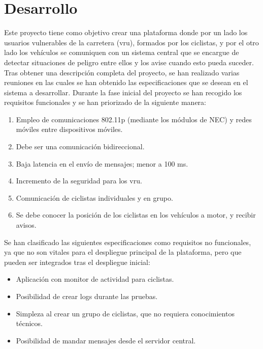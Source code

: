 \chapter{Desarrollo}\label{cha:desarrollo}
Este proyecto tiene como objetivo crear una plataforma donde por un lado los usuarios vulnerables de la carretera (\gls{vru}), formados por los ciclistas, y por el otro lado los vehículos se comuniquen con un sistema central que se encargue de detectar situaciones de peligro entre ellos y los avise cuando esto pueda suceder. Tras obtener una descripción completa del proyecto, se han realizado varias reuniones en las cuales se han obtenido las especificaciones que se desean en el sistema a desarrollar. Durante la fase inicial del proyecto se han recogido los requisitos funcionales y se han priorizado de la siguiente manera:
\begin{enumerate}
	\item Empleo de comunicaciones \Gls{802.11p} (mediante los módulos de NEC) y redes móviles entre dispositivos móviles.
	\item Debe ser una comunicación bidireccional.
	\item Baja latencia en el envío de mensajes; menor a 100 ms.
	\item Incremento de la seguridad para los \gls{vru}.
	\item Comunicación de ciclistas individuales y en grupo.
	\item Se debe conocer la posición de los ciclistas en los vehículos a motor, y recibir avisos.
\end{enumerate}

Se han clasificado las siguientes especificaciones como requisitos no funcionales, ya que no son vitales para el despliegue principal de la plataforma, pero que pueden ser integrados tras el despliegue inicial:
\begin{itemize}
	\item Aplicación con monitor de actividad para ciclistas.
	\item Posibilidad de crear logs durante las pruebas.
	\item Simpleza al crear un grupo de ciclistas, que no requiera conocimientos técnicos.
	\item Posibilidad de mandar mensajes desde el servidor central.
\end{itemize}

